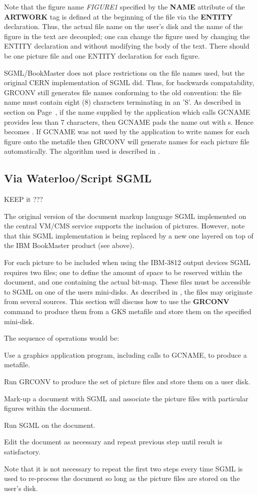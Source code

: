 Note that the figure name {\it FIGURE1} specified by the {\bf NAME}
attribute of the {\bf ARTWORK} tag is defined at the beginning of the
file via the {\bf ENTITY} declaration. Thus, the actual file name
on the user's disk and the name of the figure in the text are decoupled;
one can change the figure used by changing the ENTITY declaration
and without modifying the body of the text.
There should be one picture file and one ENTITY declaration for each figure.
 
SGML/BookMaster does not place restrictions on the file names used,
but the original CERN implementation of SGML did. Thus, for backwards
compatability, GRCONV still generates file names conforming
to the old convention: the file name must contain
eight (8) characters terminating in an 'S'.
As described in section on Page~\pageref{sec:gcnref},
if the name supplied by the application
which calls GCNAME provides less than 7 characters, then GCNAME pads the name
out with s. Hence  becomes .
If GCNAME was not used by the application to write names for
each figure onto the metafile then GRCONV will generate names
for each picture file automatically. The algorithm used is described
in \cite{bib-grref}.
\subsection{Via Waterloo/Script SGML}
\Lit{$==>$} KEEP it ???
 
The original version of the document markup language SGML \cite{bib-sgmlref}
implemented on the central VM/CMS service supports the inclusion of pictures.
However, note that this SGML implementation is being replaced
by a new one layered on top of the IBM BookMaster product (see above).
 
For each picture to be included when using the IBM-3812 
output devices SGML requires two files;
one to define the amount of space to be reserved within the document,
and one containing the actual bit-map. These files must be accessible to
SGML on one of the users mini-disks.
As described in \cite{bib-sgmlref}, the files may originate from several
sources. This section will discuss how to use the {\bf GRCONV} command to
produce them from a GKS metafile and store them on the specified mini-disk.
 
The sequence of operations would be:
\begin{OL}
\item Use a graphics application program, including calls to GCNAME,
to produce a metafile.
\item Run GRCONV to produce the set of picture files and store them on
a user disk.
\item Mark-up a document with SGML and associate the picture files
with particular figures within the document.
\item Run SGML on the document.
\item Edit the document as necessary and repeat previous step until
result is satisfactory.
\end{OL}
Note that it is not necessary to repeat the first two steps every time
SGML is used to re-process the document so long as the picture files
are stored on the user's disk.
 
